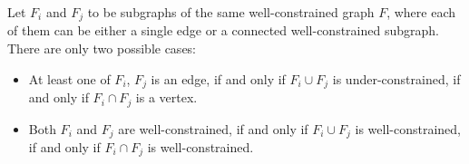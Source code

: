 \begin{lemma}
\label{lem:pinned_union_intersection}
Let $F_i$ and $F_j$ to be subgraphs of the same well-constrained graph $F$,
where each of them can be either  a single edge or a connected well-constrained subgraph.
There are only two possible cases:
\begin{itemize}
\item At least one of $F_i$, $F_j$ is an edge, if and only if $F_i \cup F_j$ is under-constrained, if and only if $F_i \cap F_j$ is a vertex.
\item Both $F_i$ and $F_j$ are well-constrained, if and only if $F_i \cup F_j$ is well-constrained, if and only if $F_i \cap F_j$ is well-constrained.
\end{itemize}


\end{lemma}


%

